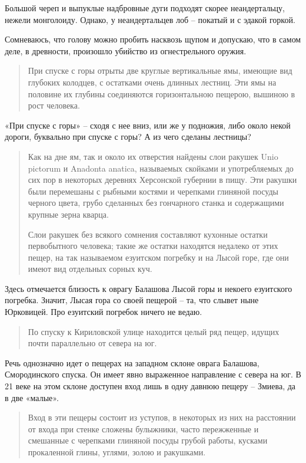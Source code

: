 Большой череп и выпуклые надбровные дуги подходят скорее неандертальцу, нежели монголоиду. Однако, у неандертальцев лоб – покатый и с эдакой горкой.

Сомневаюсь, что голову можно пробить насквозь щупом и допускаю, что в самом деле, в древности, произошло убийство из огнестрельного оружия.

\begin{quotation}
При спуске с горы отрыты две круглые вертикальные ямы, имеющие вид глубоких колодцев, с остатками очень длинных лестниц. Эти ямы на половине их глубины соединяются горизонтальною пещерою, вышиною в рост человека.
\end{quotation}

«При спуске с горы» – сходя с нее вниз, или же у подножия, либо около некой дороги, буквально при спуске с горы? А из чего сделаны лестницы? 

\begin{quotation}
Как на дне ям, так и около их отверстия найдены слои ракушек Unio pictorum и Anadonta anatica, называемых скойками и употребляемых до сих пор в некоторых деревнях Херсонской губернии в пищу. Эти ракушки были перемешаны с рыбными костями и черепками глиняной посуды черного цвета, грубо сделанных без гончарного станка и содержащими крупные зерна кварца.

Слои ракушек без всякого сомнения составляют кухонные остатки первобытного человека; такие же остатки находятся недалеко от этих пещер, на так называемом езуитском погребку и на Лысой горе, где они имеют вид отдельных сорных куч.
\end{quotation}

Здесь отмечается близость к оврагу Балашова Лысой горы и некоего езуитского погребка. Значит, Лысая гора со своей пещерой – та, что слывет ныне Юрковицей. Про езуитский погребок ничего не ведаю.

\begin{quotation}
По спуску к Кириловской улице находится целый ряд пещер, идущих почти параллельно от севера на юг.
\end{quotation}

Речь однозначно идет о пещерах на западном склоне оврага Балашова, Смородинского спуска. Он имеет явно выраженное направление с севера на юг. В 21 веке на этом склоне доступен вход лишь в одну давнюю пещеру – Змиева, да в две «малые».

\begin{quotation}
Вход в эти пещеры состоит из уступов, в некоторых из них на расстоянии от входа при стенке сложены булыжники, часто пережженные и смешанные с черепками глиняной посуды грубой работы, кусками прокаленной глины, углями, золою и ракушками.
\end{quotation}

